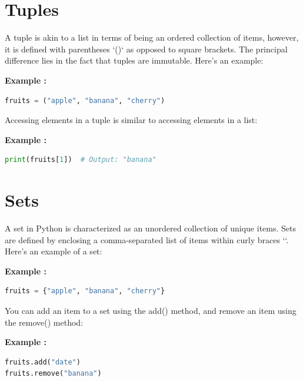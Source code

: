 \documentclass[12pt]{book}
\newtheorem{Example}{Example}[chapter]
\renewenvironment{Example}{\begin{trivlist}\item\relax
\textbf{Example \thesection: }}{\end{trivlist}}
\begin{document}
\section{Tuples}
A tuple is akin to a list in terms of being an ordered collection of items, however, it is defined with parentheses `()` as opposed to square brackets. The principal difference lies in the fact that tuples are immutable. Here's an example:
\begin{Example}
\begin{lstlisting}[language=Python]
fruits = ("apple", "banana", "cherry")
\end{lstlisting}
\end{Example}
Accessing elements in a tuple is similar to accessing elements in a list:
\begin{Example}
\begin{lstlisting}[language=Python]
print(fruits[1])  # Output: "banana"
\end{lstlisting}
\end{Example}

\section{Sets}
A set in Python is characterized as an unordered collection of unique items. Sets are defined by enclosing a comma-separated list of items within curly braces `{}`. Here's an example of a set:
\begin{Example}
\begin{lstlisting}[language=Python]
fruits = {"apple", "banana", "cherry"}
\end{lstlisting}
\end{Example}
You can add an item to a set using the add() method, and remove an item using the remove() method:
\begin{Example}
\begin{lstlisting}[language=Python]
fruits.add("date")
fruits.remove("banana")
\end{lstlisting}
\end{Example}
\end{document}
